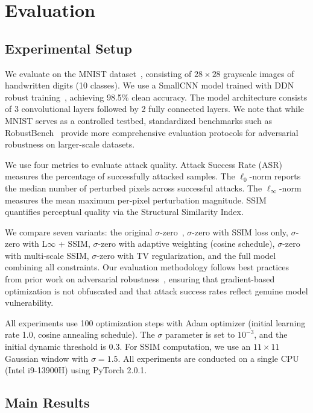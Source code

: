 \section{Evaluation}
\label{sec:evaluation}

\subsection{Experimental Setup}

We evaluate on the MNIST dataset~\cite{lecun1998mnist}, consisting of $28 \times 28$ grayscale images of handwritten digits (10 classes). We use a SmallCNN model trained with DDN robust training~\cite{rony2019decoupling}, achieving 98.5\% clean accuracy. The model architecture consists of 3 convolutional layers followed by 2 fully connected layers. We note that while MNIST serves as a controlled testbed, standardized benchmarks such as RobustBench~\cite{croce2021robustbench} provide more comprehensive evaluation protocols for adversarial robustness on larger-scale datasets.

We use four metrics to evaluate attack quality. Attack Success Rate (ASR) measures the percentage of successfully attacked samples. The $\ell_0$-norm reports the median number of perturbed pixels across successful attacks. The $\ell_\infty$-norm measures the mean maximum per-pixel perturbation magnitude. SSIM~\cite{wang2004image} quantifies perceptual quality via the Structural Similarity Index.

We compare seven variants: the original $\sigma$-zero~\cite{cina2025sigma}, $\sigma$-zero with SSIM loss only, $\sigma$-zero with L$\infty$ + SSIM, $\sigma$-zero with adaptive weighting (cosine schedule), $\sigma$-zero with multi-scale SSIM, $\sigma$-zero with TV regularization, and the full model combining all constraints. Our evaluation methodology follows best practices from prior work on adversarial robustness~\cite{athalye2018obfuscated, carlini2017towards}, ensuring that gradient-based optimization is not obfuscated and that attack success rates reflect genuine model vulnerability.

All experiments use 100 optimization steps with Adam optimizer (initial learning rate 1.0, cosine annealing schedule). The $\sigma$ parameter is set to $10^{-3}$, and the initial dynamic threshold is 0.3. For SSIM computation, we use an $11 \times 11$ Gaussian window with $\sigma = 1.5$. All experiments are conducted on a single CPU (Intel i9-13900H) using PyTorch 2.0.1.

\subsection{Main Results}

